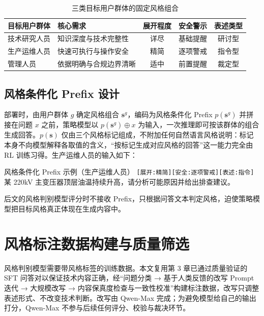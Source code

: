 \documentclass[fontset=fandol,type=master,campus=shenzhen,etitleauto=true]{hithesisbook}
\begin{document}
\begin{table}[htbp]
\centering
\caption{三类目标用户群体的固定风格组合}
\label{tab:scene-intensity-map}
\small
\setlength{\tabcolsep}{8pt}
\renewcommand{\arraystretch}{1.15}
\begin{tabular}{l l c c c}
\toprule
\textbf{目标用户群体} & \textbf{核心需求} & \textbf{展开程度} & \textbf{安全警示} & \textbf{表述类型} \\
\midrule
技术研究人员 & 知识深度与技术完整性 & 详尽 & 基础提醒 & 研讨型 \\
生产运维人员 & 快速可执行与操作安全 & 精简 & 逐项警戒 & 指令型 \\
管理人员 & 依据明确与合规边界清晰 & 适中 & 前置提醒 & 裁定型 \\
\bottomrule
\end{tabular}
\end{table}

\subsection{风格条件化 Prefix 设计}\label{ux5f3aux5ea6ux6761ux4ef6ux5316-prefix-ux8bbeux8ba1}

部署时，由用户群体 $g$ 确定风格组合 $\mathbf{s}^{g}$，编码为风格条件化 Prefix $p(\mathbf{s}^{g})$ 并拼接在问题 $x$ 之前，策略模型以 $p(\mathbf{s}^{g}) \oplus x$ 为输入，一次推理即可按该群体的组合生成回答。$p(\mathbf{s})$ 仅由三个风格标记组成，不附加任何自然语言风格说明：标记本身不向模型解释各取值的含义，“按标记生成对应风格的回答”这一能力完全由 RL 训练习得。生产运维人员的输入如下：

\begin{promptbox}{风格条件化 Prefix 示例（生产运维人员）}
\texttt{[展开:精简][安全:逐项警戒][表述:指令]}\quad 某 220kV 主变压器顶层油温持续升高，请分析可能原因并给出排查建议。
\end{promptbox}

后文的风格判别模型评分时不接收 Prefix，只根据问答文本判定风格，迫使策略模型把目标风格真正体现在生成内容中。

\section{风格标注数据构建与质量筛选}\label{ux98ceux683cux504fux597dux6570ux636eux6784ux5efaux4e0e-llm-as-judge-ux7b5bux9009}

风格判别模型需要带风格标签的训练数据。本文复用第 3 章已通过质量验证的 SFT 问答对以保证技术内容正确，经“问题分类 → 基于人类反馈的改写 Prompt 迭代 → 大规模改写 → 内容保真度检查与一致性校准”构建标注数据，改写只调整表述形式、不改变技术判断。改写由 Qwen-Max 完成；为避免模型给自己的输出打分，Qwen-Max 不参与后续任何评分、校验与裁决环节。
\end{document}
